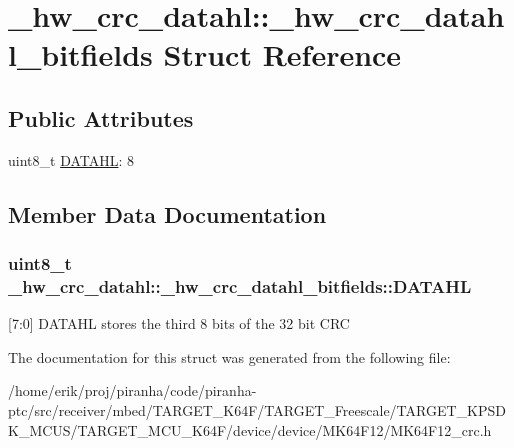 \hypertarget{struct__hw__crc__datahl_1_1__hw__crc__datahl__bitfields}{}\section{\+\_\+hw\+\_\+crc\+\_\+datahl\+:\+:\+\_\+hw\+\_\+crc\+\_\+datahl\+\_\+bitfields Struct Reference}
\label{struct__hw__crc__datahl_1_1__hw__crc__datahl__bitfields}
\subsection*{Public Attributes}
\begin{DoxyCompactItemize}
\item 
uint8\+\_\+t \hyperlink{struct__hw__crc__datahl_1_1__hw__crc__datahl__bitfields_ab063d41ecd2f5dbd6f2af8077986c2c8}{D\+A\+T\+A\+HL}\+: 8
\end{DoxyCompactItemize}


\subsection{Member Data Documentation}
\subsubsection[{\texorpdfstring{D\+A\+T\+A\+HL}{DATAHL}}]{\setlength{\rightskip}{0pt plus 5cm}uint8\+\_\+t \+\_\+hw\+\_\+crc\+\_\+datahl\+::\+\_\+hw\+\_\+crc\+\_\+datahl\+\_\+bitfields\+::\+D\+A\+T\+A\+HL}\hypertarget{struct__hw__crc__datahl_1_1__hw__crc__datahl__bitfields_ab063d41ecd2f5dbd6f2af8077986c2c8}{}\label{struct__hw__crc__datahl_1_1__hw__crc__datahl__bitfields_ab063d41ecd2f5dbd6f2af8077986c2c8}
\mbox{[}7\+:0\mbox{]} D\+A\+T\+A\+HL stores the third 8 bits of the 32 bit C\+RC 

The documentation for this struct was generated from the following file\+:\begin{DoxyCompactItemize}
\item 
/home/erik/proj/piranha/code/piranha-\/ptc/src/receiver/mbed/\+T\+A\+R\+G\+E\+T\+\_\+\+K64\+F/\+T\+A\+R\+G\+E\+T\+\_\+\+Freescale/\+T\+A\+R\+G\+E\+T\+\_\+\+K\+P\+S\+D\+K\+\_\+\+M\+C\+U\+S/\+T\+A\+R\+G\+E\+T\+\_\+\+M\+C\+U\+\_\+\+K64\+F/device/device/\+M\+K64\+F12/M\+K64\+F12\+\_\+crc.\+h\end{DoxyCompactItemize}

